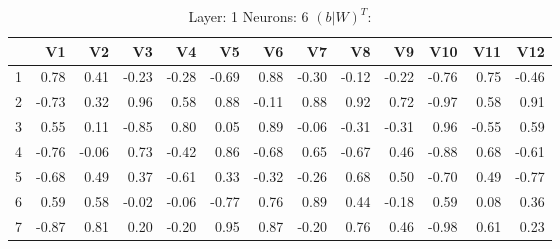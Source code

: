 \begin{table}[ht]
\centering
\begin{tabular}{rrrrrrrrrrrrr}
  \hline
 & V1 & V2 & V3 & V4 & V5 & V6 & V7 & V8 & V9 & V10 & V11 & V12 \\ 
  \hline
1 & 0.78 & 0.41 & -0.23 & -0.28 & -0.69 & 0.88 & -0.30 & -0.12 & -0.22 & -0.76 & 0.75 & -0.46 \\ 
  2 & -0.73 & 0.32 & 0.96 & 0.58 & 0.88 & -0.11 & 0.88 & 0.92 & 0.72 & -0.97 & 0.58 & 0.91 \\ 
  3 & 0.55 & 0.11 & -0.85 & 0.80 & 0.05 & 0.89 & -0.06 & -0.31 & -0.31 & 0.96 & -0.55 & 0.59 \\ 
  4 & -0.76 & -0.06 & 0.73 & -0.42 & 0.86 & -0.68 & 0.65 & -0.67 & 0.46 & -0.88 & 0.68 & -0.61 \\ 
  5 & -0.68 & 0.49 & 0.37 & -0.61 & 0.33 & -0.32 & -0.26 & 0.68 & 0.50 & -0.70 & 0.49 & -0.77 \\ 
  6 & 0.59 & 0.58 & -0.02 & -0.06 & -0.77 & 0.76 & 0.89 & 0.44 & -0.18 & 0.59 & 0.08 & 0.36 \\ 
  7 & -0.87 & 0.81 & 0.20 & -0.20 & 0.95 & 0.87 & -0.20 & 0.76 & 0.46 & -0.98 & 0.61 & 0.23 \\ 
   \hline
\end{tabular}
\caption{Layer: 1 Neurons: 6  $(b|W)^T$: 
} 
\end{table}
